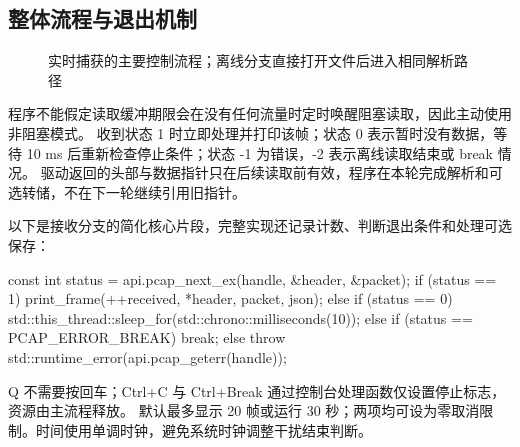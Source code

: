 \documentclass[UTF8,notitlepage,11pt]{ctexart}
\begin{document}
\subsection{整体流程与退出机制}
\begin{figure}[H]\centering
{}\caption{实时捕获的主要控制流程；离线分支直接打开文件后进入相同解析路径}
\end{figure}

程序不能假定读取缓冲期限会在没有任何流量时定时唤醒阻塞读取，因此主动使用非阻塞模式\cite{nonblock}。
收到状态 1 时立即处理并打印该帧；状态 0 表示暂时没有数据，等待 10 ms 后重新检查停止条件；状态 -1 为错误，-2 表示离线读取结束或 break 情况\cite{nextex}。
驱动返回的头部与数据指针只在后续读取前有效，程序在本轮完成解析和可选转储，不在下一轮继续引用旧指针。

以下是接收分支的简化核心片段，完整实现还记录计数、判断退出条件和处理可选保存：
\begin{code}
const int status = api.pcap_next_ex(handle, &header, &packet);
if (status == 1) {
    print_frame(++received, *header, packet, json);
} else if (status == 0) {
    std::this_thread::sleep_for(std::chrono::milliseconds(10));
} else if (status == PCAP_ERROR_BREAK) {
    break;
} else {
    throw std::runtime_error(api.pcap_geterr(handle));
}
\end{code}

Q 不需要按回车；Ctrl+C 与 Ctrl+Break 通过控制台处理函数仅设置停止标志，资源由主流程释放。
默认最多显示 20 帧或运行 30 秒；两项均可设为零取消限制。时间使用单调时钟，避免系统时钟调整干扰结束判断。
\end{document}
